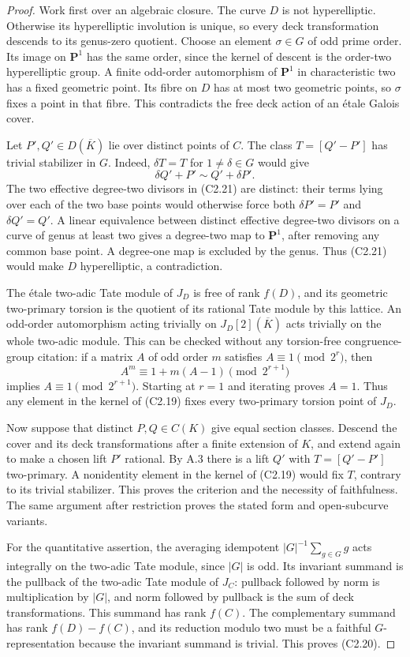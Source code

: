 \begin{proof}
Work first over an algebraic closure. The curve $D$ is not
hyperelliptic. Otherwise its hyperelliptic involution is unique,
so every deck transformation descends to its genus-zero quotient.
Choose an element $\sigma\in G$ of odd prime order. Its image on
$\mathbf P^1$ has the same order, since the kernel of descent is
the order-two hyperelliptic group. A finite odd-order automorphism
of $\mathbf P^1$ in characteristic two has a fixed geometric
point. Its fibre on $D$ has at most two geometric points, so
$\sigma$ fixes a point in that fibre. This contradicts the free
deck action of an \'etale Galois cover.

Let $P',Q'\in D(\overline K)$ lie over distinct points of $C$.
The class $T=[Q'-P']$ has trivial stabilizer in $G$. Indeed,
$\delta T=T$ for $1\ne\delta\in G$ would give
\[
                     \delta Q'+P'\sim Q'+\delta P'.
                                                               \tag{C2.21}
\]
The two effective degree-two divisors in (C2.21) are distinct:
their terms lying over each of the two base points would
otherwise force both $\delta P'=P'$ and $\delta Q'=Q'$.
A linear equivalence between distinct effective degree-two
divisors on a curve of genus at least two gives a degree-two
map to $\mathbf P^1$, after removing any common base point.
A degree-one map is excluded by the genus. Thus (C2.21) would
make $D$ hyperelliptic, a contradiction.

The \'etale two-adic Tate module of $J_D$ is free of rank $f(D)$,
and its geometric two-primary torsion is the quotient of its
rational Tate module by this lattice. An odd-order automorphism
acting trivially on $J_D[2](\overline K)$ acts trivially on the
whole two-adic module. This can be checked without any
torsion-free congruence-group citation: if a matrix $A$ of odd
order $m$ satisfies $A\equiv1\pmod{2^r}$, then
\[
 A^m\equiv1+m(A-1)\pmod{2^{r+1}}
\]
implies $A\equiv1\pmod{2^{r+1}}$. Starting at $r=1$ and
iterating proves $A=1$. Thus any element in the kernel of
(C2.19) fixes every two-primary torsion point of $J_D$.

Now suppose that distinct $P,Q\in C(K)$ give equal section
classes. Descend the cover and its deck transformations after
a finite extension of $K$, and extend again to make a chosen
lift $P'$ rational. By A.3 there is a lift $Q'$ with
$T=[Q'-P']$ two-primary. A nonidentity element in the kernel
of (C2.19) would fix $T$, contrary to its trivial stabilizer.
This proves the criterion and the necessity of faithfulness.
The same argument after restriction proves the stated form and
open-subcurve variants.

For the quantitative assertion, the averaging idempotent
$|G|^{-1}\sum_{g\in G}g$ acts integrally on the two-adic Tate
module, since $|G|$ is odd. Its invariant summand is the
pullback of the two-adic Tate module of $J_C$: pullback
followed by norm is multiplication by $|G|$, and norm followed
by pullback is the sum of deck transformations. This summand
has rank $f(C)$. The complementary summand has rank
$f(D)-f(C)$, and its reduction modulo two must be a faithful
$G$-representation because the invariant summand is trivial.
This proves (C2.20).
\end{proof}

